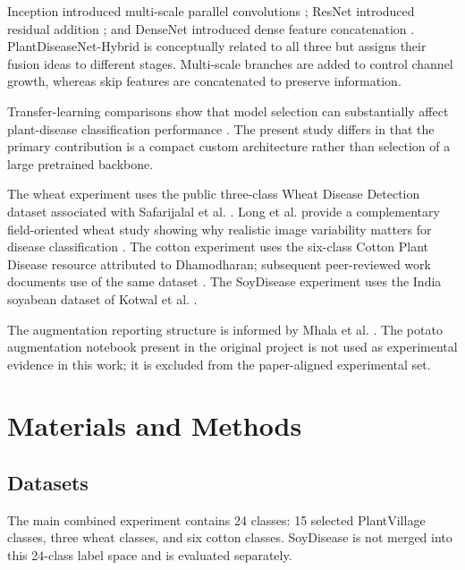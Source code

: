 \documentclass[a4paper,fleqn]{cas-dc}
\begin{document}
Inception introduced multi-scale parallel convolutions \citep{szegedy2015}; ResNet introduced residual addition \citep{he2016}; and DenseNet introduced dense feature concatenation \citep{huang2017}. PlantDiseaseNet-Hybrid is conceptually related to all three but assigns their fusion ideas to different stages. Multi-scale branches are added to control channel growth, whereas skip features are concatenated to preserve information.

Transfer-learning comparisons show that model selection can substantially affect plant-disease classification performance \citep{too2019,atila2021}. The present study differs in that the primary contribution is a compact custom architecture rather than selection of a large pretrained backbone.

The wheat experiment uses the public three-class Wheat Disease Detection dataset associated with Safarijalal et al. \citep{safarijalal2022}. Long et al. provide a complementary field-oriented wheat study showing why realistic image variability matters for disease classification \citep{long2023}. The cotton experiment uses the six-class Cotton Plant Disease resource attributed to Dhamodharan; subsequent peer-reviewed work documents use of the same dataset \citep{cotton2024}. The SoyDisease experiment uses the India soyabean dataset of Kotwal et al. \citep{kotwal2024}.

The augmentation reporting structure is informed by Mhala et al. \citep{mhala2025}. The potato augmentation notebook present in the original project is not used as experimental evidence in this work; it is excluded from the paper-aligned experimental set.

\section{Materials and Methods}
\subsection{Datasets}
The main combined experiment contains 24 classes: 15 selected PlantVillage classes, three wheat classes, and six cotton classes. SoyDisease is not merged into this 24-class label space and is evaluated separately.
\end{document}
